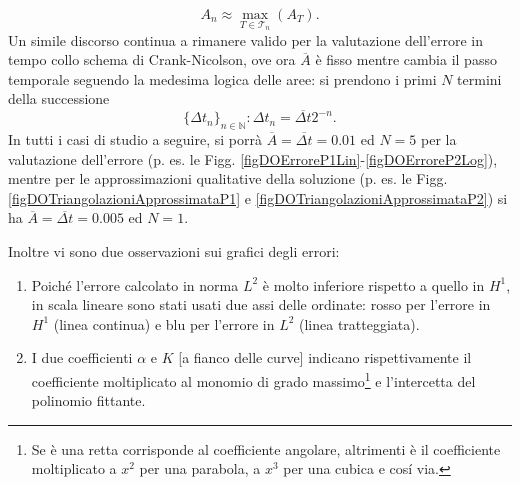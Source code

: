 \documentclass{article}
\begin{document}
            \begin{equation*}
                A_n\approx\max_{T\in\mathcal T_n}\left(A_T\right).
            \end{equation*}
            Un simile discorso continua a rimanere valido per la valutazione dell'errore in tempo collo schema di Crank-Nicolson, ove ora $\overline A$ è fisso mentre cambia il passo temporale seguendo la medesima logica delle aree: si prendono i primi $N$ termini della successione
            \begin{equation*}
                \{\Delta t_n\}_{n\in\mathbb N}:\Delta t_n=\overline{\Delta t}2^{-n}.
            \end{equation*}
            In tutti i casi di studio a seguire, si porrà $\overline A=\overline{\Delta t}=0.01$ ed $N=5$ per la valutazione dell'errore (p. es. le Figg. \ref{figDOErroreP1Lin}-\ref{figDOErroreP2Log}), mentre per le approssimazioni qualitative della soluzione (p. es. le Figg. \ref{figDOTriangolazioniApprossimataP1} e \ref{figDOTriangolazioniApprossimataP2}) si ha $\overline A=\overline{\Delta t}=0.005$ ed $N=1$.
            
            Inoltre vi sono due osservazioni sui grafici degli errori:
    
            \begin{enumerate}[label=\arabic*.,    %
                              itemsep=0pt,        %
                              leftmargin=12.5pt]    %
            
                \item Poiché l'errore calcolato in norma $L^2$ è molto inferiore rispetto a quello in $H^1$, in scala lineare sono stati usati due assi delle ordinate: rosso per l'errore in $H^1$ (linea continua) e blu per l'errore in $L^2$ (linea tratteggiata).
                
                \item I due coefficienti $\alpha$ e $K$ [a fianco delle curve] indicano rispettivamente il coefficiente moltiplicato al monomio di grado massimo\footnote{Se è una retta corrisponde al coefficiente angolare, altrimenti è il coefficiente moltiplicato a $x^2$ per una parabola, a $x^3$ per una cubica e cosí via.} e l'intercetta del polinomio fittante.
    
            \end{enumerate}
    
\end{document}
